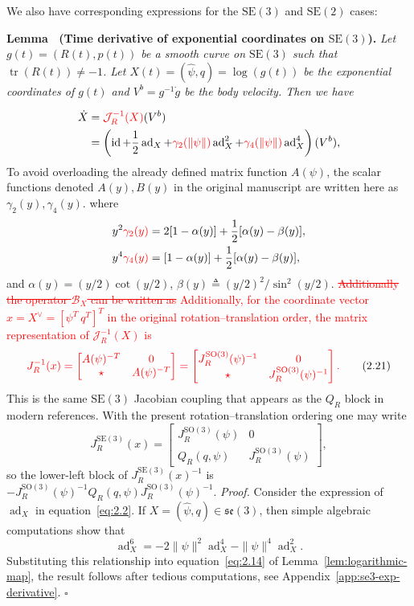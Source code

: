 \documentclass[11pt]{article}
\newcommand{\rev}[1]{\textcolor{red}{#1}}
\newcommand{\del}[1]{\textcolor{red}{\sout{#1}}}
\newenvironment{revision}{\color{red}}{}
\newcommand{\JopR}{\mathcal J_R}
\newcommand{\JR}{J_R}
\newcommand{\SO}{\mathrm{SO}}
\newcommand{\SE}{\mathrm{SE}}
\newcommand{\se}{\mathfrak{se}}
\newcommand{\ad}{\operatorname{ad}}
\newcommand{\id}{\operatorname{id}}
\newcommand{\tr}{\operatorname{tr}}
\newcommand{\proofbox}{\hfill$\square$}
\newcounter{paperlemma}
\renewcommand{\thepaperlemma}{\arabic{paperlemma}}
\newcommand{\paperlemma}[3]{\refstepcounter{paperlemma}\par\medskip\noindent\textbf{Lemma \thepaperlemma\ (#1).}\label{#2} \textit{#3}\par}
\begin{document}
We also have corresponding expressions for the $\SE(3)$ and $\SE(2)$ cases:

\paperlemma{Time derivative of exponential coordinates on $\SE(3)$}{lem:se3-exp-coordinate-derivative}{Let $g(t)=(R(t),p(t))$ be a smooth curve on $\SE(3)$ such that $\tr(R(t))\neq-1$. Let $X(t)=(\widehat\psi,q)=\log(g(t))$ be the exponential coordinates of $g(t)$ and $V^b=g^{-1}\dot g$ be the body velocity. Then we have}
\begin{align*}
\dot X&=\rev{\JopR^{-1}(X)}(V^b)\\
&=\left(\id+\frac12\ad_X+\rev{\gamma_2(\|\psi\|)}\ad_X^2+\rev{\gamma_4(\|\psi\|)}\ad_X^4\right)(V^b),
\end{align*}
\begin{revision}
To avoid overloading the already defined matrix function $A(\psi)$, the scalar functions denoted $A(y),B(y)$ in the original manuscript are written here as $\gamma_2(y),\gamma_4(y)$.
\end{revision}
where
\begin{align*}
y^2\rev{\gamma_2(y)}&=2[1-\alpha(y)]+\frac12[\alpha(y)-\beta(y)],\\
y^4\rev{\gamma_4(y)}&=[1-\alpha(y)]+\frac12[\alpha(y)-\beta(y)],
\end{align*}
and $\alpha(y)=(y/2)\cot(y/2)$, $\beta(y)\triangleq(y/2)^2/\sin^2(y/2)$. \del{Additionally the operator $\mathcal B_X$ can be written as} \rev{Additionally, for the coordinate vector $x=X^\vee=[\psi^T\ q^T]^T$ in the original rotation--translation order, the matrix representation of $\JopR^{-1}(X)$ is}
\begin{equation*}
\rev{\JR^{-1}(x)=\begin{bmatrix}A(\psi)^{-T}&0\\\star&A(\psi)^{-T}\end{bmatrix}
=\begin{bmatrix}J_R^{\SO(3)}(\psi)^{-1}&0\\\star&J_R^{\SO(3)}(\psi)^{-1}\end{bmatrix}.}\tag{2.21}\label{eq:2.21}
\end{equation*}
\begin{revision}
This is the same $\SE(3)$ Jacobian coupling that appears as the $Q_R$ block in modern references.  With the present rotation--translation ordering one may write
\[
J_R^{\SE(3)}(x)=\begin{bmatrix}J_R^{\SO(3)}(\psi)&0\\Q_R(q,\psi)&J_R^{\SO(3)}(\psi)\end{bmatrix},
\]
so the lower-left block of $J_R^{\SE(3)}(x)^{-1}$ is
$-J_R^{\SO(3)}(\psi)^{-1}Q_R(q,\psi)J_R^{\SO(3)}(\psi)^{-1}$.
\end{revision}
\emph{Proof.} Consider the expression of $\ad_X$ in equation~\eqref{eq:2.2}. If $X=(\widehat\psi,q)\in\se(3)$, then simple algebraic computations show that
\begin{equation*}
\ad_X^6=-2\|\psi\|^2\ad_X^4-\|\psi\|^4\ad_X^2.
\end{equation*}
Substituting this relationship into equation~\eqref{eq:2.14} of Lemma~\ref{lem:logarithmic-map}, the result follows after tedious computations, see Appendix~\ref{app:se3-exp-derivative}. \proofbox
\end{document}
